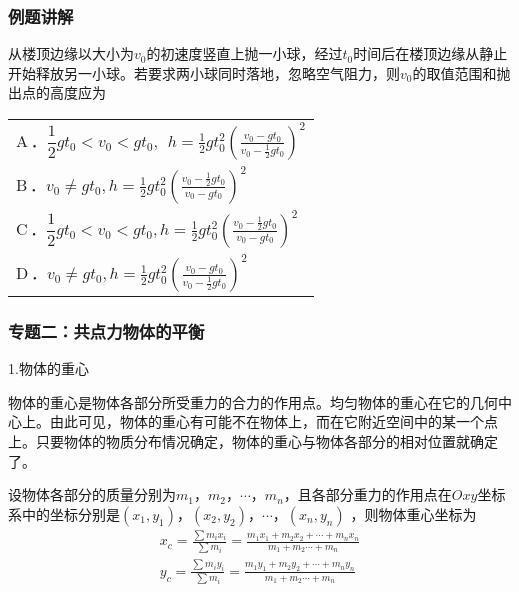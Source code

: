\documentclass{beamer}
\newcommand{\fourch}[4]{
\renewcommand\arraystretch{1.4}
\begin{tabularx}{\linewidth}{X}
\setlength\tabcolsep{0pt}
A\,．#1 \\
B\,．#2 \\
C\,．#3 \\
D\,．#4 \\
\end{tabularx}
\unskip \unskip}
\begin{document}
    \begin{frame}[t]
        \frametitle{例题讲解}
    从楼顶边缘以大小为$v_0$的初速度竖直上抛一小球，经过$t_0$时间后在楼顶边缘从静止开始释放另一小球。若要求两小球同时落地，忽略空气阻力，则$v_0$的取值范围和抛出点的高度应为

    \fourch{$\dfrac{1}{2}gt_0<v_0<gt_0, ~~h=\frac{1}{2}gt_0^2\left(\frac{v_0-gt_0}{v_0-\frac{1}{2}gt_0}\right)^2$}{$v_0\neq gt_0,h=\frac{1}{2}gt_0^2\left(\frac{v_0-\frac{1}{2}gt_0}{v_0-gt_0}\right)^2$}{$\dfrac{1}{2}gt_0<v_0<gt_0,h=\frac{1}{2}gt_0^2\left(\frac{v_0-\frac{1}{2}gt_0}{v_0-gt_0}\right)^2$}{$v_0\neq gt_0,h=\frac{1}{2}gt_0^2\left(\frac{v_0-gt_0}{v_0-\frac{1}{2}gt_0}\right)^2$}
        
    
    \end{frame}
    \begin{frame}
        \frametitle{专题二：共点力物体的平衡}
    
        1.物体的重心

        物体的重心是物体各部分所受重力的合力的作用点。均匀物体的重心在它的几何中心上。由此可见，物体的重心有可能不在物体上，而在它附近空间中的某一个点上。只要物体的物质分布情况确定，物体的重心与物体各部分的相对位置就确定了。

        设物体各部分的质量分别为$m_1$，$m_2$，$\cdots$，$m_n$，且各部分重力的作用点在$Oxy$坐标系中的坐标分别是$(x_1,y_1)$，$(x_2,y_2)$，$\cdots$，$\left(x_n,y_n\right)$ ，则物体重心坐标为
        \begin{equation}
            \begin{split}
                x_c=\frac{\sum m_i x_i}{\sum m_i}=\frac{m_1 x_1+m_2x_2+\cdots+m_n x_n}{m_1+m_2\cdots+m_n}\\
                y_c=\frac{\sum m_i y_i}{\sum m_i}=\frac{m_1 y_1+m_2y_2+\cdots+m_n y_n}{m_1+m_2\cdots+m_n}
            \end{split}           
        \end{equation}   
    \end{frame}
\end{document}
